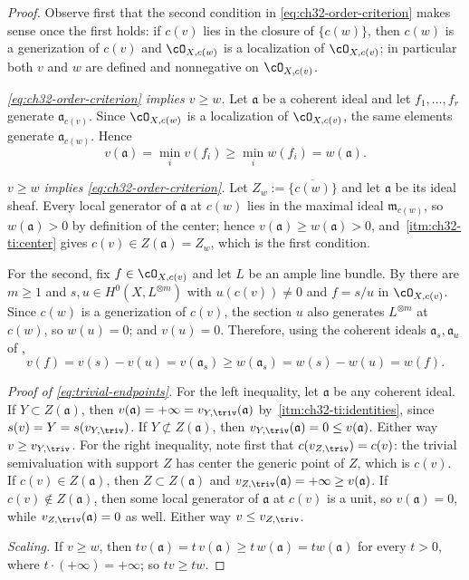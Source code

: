 \begin{proof}
Observe first that the second condition in
\eqref{eq:ch32-order-criterion} makes sense once the first holds: if
$c(v)$ lies in the closure of $\{c(w)\}$, then $c(w)$ is a
generization of $c(v)$ and $\cO_{X,c(w)}$ is a localization of
$\cO_{X,c(v)}$; in particular both $v$ and $w$ are defined and
nonnegative on $\cO_{X,c(v)}$.

\emph{\eqref{eq:ch32-order-criterion} implies $v\geq w$.}  Let
$\mathfrak a$ be a coherent ideal and let $f_1,\ldots,f_r$ generate
$\mathfrak a_{c(v)}$.  Since $\cO_{X,c(w)}$ is a localization of
$\cO_{X,c(v)}$, the same elements generate $\mathfrak a_{c(w)}$.  Hence
\[
 v(\mathfrak a)=\min_iv(f_i)\geq\min_iw(f_i)=w(\mathfrak a).
\]

\emph{$v\geq w$ implies \eqref{eq:ch32-order-criterion}.}  Let
$Z_w:=\overline{\{c(w)\}}$ and let $\mathfrak a$ be its ideal sheaf.
Every local generator of $\mathfrak a$ at $c(w)$ lies in the maximal
ideal $\mathfrak m_{c(w)}$, so $w(\mathfrak a)>0$ by definition of the
center; hence $v(\mathfrak a)\geq w(\mathfrak a)>0$, and
\,\cref{itm:ch32-ti:center} gives
$c(v)\in Z(\mathfrak a)=Z_w$, which is the first condition.

For the second, fix $f\in\cO_{X,c(v)}$ and let $L$ be an ample line
bundle.  By  there are
$m\geq1$ and $s,u\in H^0(X,L^{\otimes m})$ with $u(c(v))\neq0$ and
$f=s/u$ in $\cO_{X,c(v)}$.  Since $c(w)$ is a generization of
$c(v)$, the section $u$ also generates $L^{\otimes m}$ at $c(w)$, so
$w(u)=0$; and $v(u)=0$.  Therefore, using the coherent ideals
$\mathfrak a_s,\mathfrak a_u$ of ,
\[
 v(f)=v(s)-v(u)=v(\mathfrak a_s)
      \geq w(\mathfrak a_s)=w(s)-w(u)=w(f).
\]

\emph{Proof of \eqref{eq:trivial-endpoints}.}  For the left inequality, let
$\mathfrak a$ be any coherent ideal.  If $Y\subset Z(\mathfrak a)$, then
$v(\mathfrak a)=+\infty=v_{Y,\triv}(\mathfrak a)$ by
\,\cref{itm:ch32-ti:identities}, since
$s(v)=Y=s(v_{Y,\triv})$.  If $Y\not\subset Z(\mathfrak a)$, then
$v_{Y,\triv}(\mathfrak a)=0\leq v(\mathfrak a)$.  Either way
$v\geq v_{Y,\triv}$.  For the right inequality, note first that
$c(v_{Z,\triv})=c(v)$: the trivial semivaluation with support $Z$ has
center the generic point of $Z$, which is $c(v)$.  If
$c(v)\in Z(\mathfrak a)$, then
$Z\subset Z(\mathfrak a)$ and
$v_{Z,\triv}(\mathfrak a)=+\infty\geq v(\mathfrak a)$.  If
$c(v)\notin Z(\mathfrak a)$, then some local generator of
$\mathfrak a$ at $c(v)$ is a unit, so $v(\mathfrak a)=0$, while
$v_{Z,\triv}(\mathfrak a)=0$ as well.  Either way
$v\leq v_{Z,\triv}$.

\emph{Scaling.}  If $v\geq w$, then $tv(\mathfrak a)=t\,v(\mathfrak a)
\geq t\,w(\mathfrak a)=tw(\mathfrak a)$ for every $t>0$, where
$t\cdot(+\infty)=+\infty$; so $tv\geq tw$.
\end{proof}

